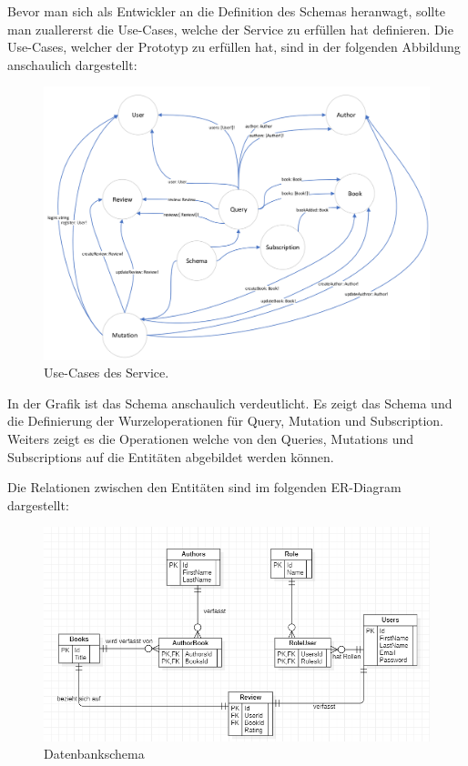 Bevor man sich als Entwickler an die Definition des Schemas heranwagt, sollte man zuallererst die Use-Cases, welche der Service zu erfüllen hat definieren.
Die Use-Cases, welcher der Prototyp zu erfüllen hat, sind in der folgenden Abbildung anschaulich dargestellt:

\begin{figure}[H]
    \includegraphics[width=\textwidth]{pics/graph_usecases.png}
    \caption{Use-Cases des Service.}
\end{figure}

In der Grafik ist das Schema anschaulich verdeutlicht.
Es zeigt das Schema und die Definierung der Wurzeloperationen für Query, Mutation und Subscription.
Weiters zeigt es die Operationen welche von den Queries, Mutations und Subscriptions auf die Entitäten abgebildet werden können.

Die Relationen zwischen den Entitäten sind im folgenden ER-Diagram dargestellt:
\begin{figure}[H]
    \includegraphics[width=\textwidth]{pics/ER-Diagram.png}
    \caption{Datenbankschema}
\end{figure}

